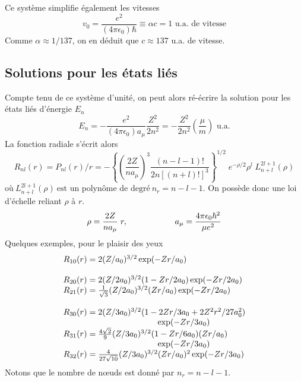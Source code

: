 Ce système simplifie également les vitesses
\begin{equation}
v_0 = \frac{e^2}{(4\pi\epsilon_0)\hbar}\equiv \alpha c = 1 \text{ u.a. de vitesse}
\end{equation}
Comme $\alpha \approx 1/137$, on en déduit que $c\approx 137$ u.a. de vitesse.\\


\subsection{Solutions pour les états liés}
Compte tenu de ce système d'unité, on peut alors ré-écrire la solution pour les états liés d'énergie $E_n$
\begin{equation}
E_n = -\frac{e^2}{(4\pi\epsilon_0)a_\mu}\frac{Z^2}{2n^2}=-\dfrac{Z^2}{2n^2}\left(\frac{\mu}{m}\right)\text{ u.a.}
\end{equation}
La fonction radiale s'écrit alors
\begin{equation}
R_{nl}(r) = P_{nl}(r) / r=
  - \left\{ \left( \frac{2Z}{na_\mu} \right)^3
   \frac{(n-l-1)!}{2n[(n+l)!]^3} \right\}^{1/2} \;
  e^{-\rho/2} \rho^l \; L^{2l+1}_{n+l} (\rho)
\end{equation}
$\mbox{o\`u}~L^{2l+1}_{n+l}(\rho)~\mbox{est un polyn\^ome de
degr\'e}~n_r = n-l-1$. On possède donc une loi d'échelle reliant $\rho$ à $r$.
\begin{equation}
\rho 
= \frac{2Z}{na_\mu} \; r, \hspace*{2cm} 
 a_\mu = \frac{4 \pi \epsilon_0 \hbar^2}{\mu e^2}
\end{equation}
Quelques exemples, pour le plaisir des yeux
\begin{equation}
\begin{array}{l}
R_{10}(r) = 2 (Z/a_0)^{3/2} \exp (-Zr/a_0) \\
\ \\
R_{20}(r) = 2 (Z/2 a_0)^{3/2} (1-Zr/2 a_0) \exp (-Zr/2 a_0) \\
R_{21}(r) = \frac{1}{\sqrt{3}}  (Z/2 a_0)^{3/2} (Zr/a_0)
        \exp (-Zr/2 a_0) \\
\ \\
R_{30}(r) = 2 (Z/3a_0)^{3/2} (1 - 2Zr/3 a_0 + 2 Z^2r^2/27a_0^2) \\
  \hspace*{4cm}  \exp(-Zr/3a_0) \\
R_{31}(r) = \frac{4 \sqrt{2}}{9} (Z/3a_0)^{3/2}
  (1 -Zr/6a_0)(Zr/a_0) \\
  \hspace*{4cm} \exp(-Zr/3 a_0) \\
R_{32}(r) = \frac{4}{27 \sqrt{10}} (Z/3a_0)^{3/2} (Zr/a_0)^2 
   \exp(-Zr/3a_0)
\end{array}
\end{equation}
Notons que le nombre de nœuds est donné 
par $n_r=n-l-1$.

